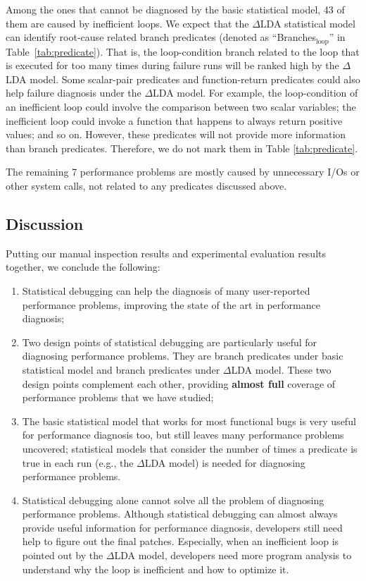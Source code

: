 Among the ones that cannot be diagnosed by the basic statistical model,
43 of them are caused by inefficient loops. We expect that the 
$\Delta$LDA statistical model can identify root-cause related branch predicates
(denoted as ``Branches$_{\text{loop}}$'' in Table~\ref{tab:predicate}).
That is, the loop-condition branch related to the loop that is executed for too
many times
during failure runs will be ranked high by the $\Delta$LDA model.
Some scalar-pair predicates and function-return predicates could also
help failure diagnosis under the $\Delta$LDA model. For example, the
loop-condition of an inefficient loop could involve the comparison between
two scalar variables; the inefficient loop could invoke a function that
happens to always return positive values; and so on. However, these predicates
will not provide more information than branch predicates. Therefore, we do
not mark them in Table \ref{tab:predicate}.

The remaining 7 performance problems are mostly caused by unnecessary I/Os
or other system calls, not related to any predicates discussed above.

\subsection{Discussion}

Putting our manual inspection results and
experimental evaluation results together, we conclude the following:

\begin{enumerate}
\item Statistical debugging can help the diagnosis of many
user-reported performance problems, improving the state of the art in 
performance diagnosis;

\item Two design points of statistical debugging are particularly useful
for diagnosing performance problems. They are branch predicates under
basic statistical model and branch predicates under $\Delta$LDA model.
These two design points complement each other, providing
\textbf{almost full} coverage of performance problems that we have studied;

\item The basic statistical model that works for most functional bugs
\citep{liblit03,liblit05,tarantula1,tarantula2,tarantula.darko,CCI,joy.asplos13}
is very useful for performance diagnosis too, but still leaves many performance
problems uncovered; statistical models that
consider the number of times a predicate is true 
in each run (e.g., the $\Delta$LDA model)
is needed for diagnosing performance problems.

\item Statistical debugging alone cannot solve all the problem
of diagnosing performance problems. Although statistical debugging
can almost always provide useful information for performance diagnosis, 
developers still
need help to figure out the final patches. Especially, when an inefficient
loop is pointed out by the $\Delta$LDA model, 
developers need more program analysis to understand why the loop is inefficient
and how to optimize it.
\end{enumerate}

